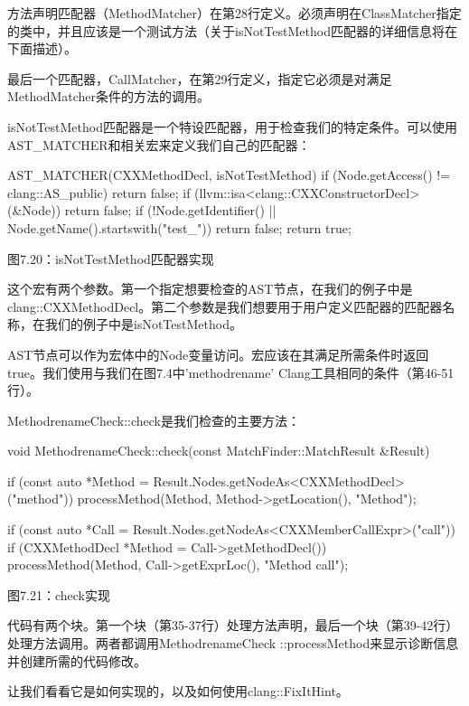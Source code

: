 方法声明匹配器（MethodMatcher）在第28行定义。必须声明在ClassMatcher指定的类中，并且应该是一个测试方法（关于isNotTestMethod匹配器的详细信息将在下面描述）。

最后一个匹配器，CallMatcher，在第29行定义，指定它必须是对满足MethodMatcher条件的方法的调用。

isNotTestMethod匹配器是一个特设匹配器，用于检查我们的特定条件。可以使用AST\_MATCHER和相关宏来定义我们自己的匹配器：

\begin{cpp}
AST_MATCHER(CXXMethodDecl, isNotTestMethod) {
  if (Node.getAccess() != clang::AS_public) return false;
  if (llvm::isa<clang::CXXConstructorDecl>(&Node)) return false;
  if (!Node.getIdentifier() || Node.getName().startswith("test_")) return false;
  return true;
}
\end{cpp}

\begin{center}
图7.20：isNotTestMethod匹配器实现
\end{center}

这个宏有两个参数。第一个指定想要检查的AST节点，在我们的例子中是clang::CXXMethodDecl。第二个参数是我们想要用于用户定义匹配器的匹配器名称，在我们的例子中是isNotTestMethod。

AST节点可以作为宏体中的Node变量访问。宏应该在其满足所需条件时返回true。我们使用与我们在图7.4中'methodrename' Clang工具相同的条件（第46-51行）。

MethodrenameCheck::check是我们检查的主要方法：

\begin{cpp}
void MethodrenameCheck::check(const MatchFinder::MatchResult &Result) {
  if (const auto *Method = Result.Nodes.getNodeAs<CXXMethodDecl>("method")) {
    processMethod(Method, Method->getLocation(), "Method");
  }

  if (const auto *Call = Result.Nodes.getNodeAs<CXXMemberCallExpr>("call")) {
    if (CXXMethodDecl *Method = Call->getMethodDecl()) {
      processMethod(Method, Call->getExprLoc(), "Method call");
    }
  }
}
\end{cpp}

\begin{center}
图7.21：check实现
\end{center}

代码有两个块。第一个块（第35-37行）处理方法声明，最后一个块（第39-42行）处理方法调用。两者都调用MethodrenameCheck ::processMethod来显示诊断信息并创建所需的代码修改。

让我们看看它是如何实现的，以及如何使用clang::FixItHint。

